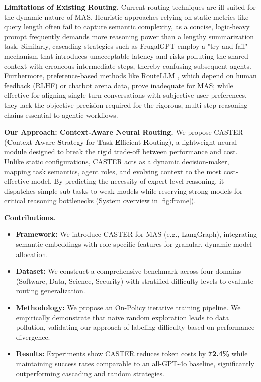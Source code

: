 \documentclass{article}
\theoremstyle{plain}
\theoremstyle{definition}
\theoremstyle{remark}
\begin{document}
\textbf{Limitations of Existing Routing.} Current routing techniques are ill-suited for the dynamic nature of MAS. Heuristic approaches relying on static metrics like query length often fail to capture semantic complexity, as a concise, logic-heavy prompt frequently demands more reasoning power than a lengthy summarization task. Similarly, cascading strategies such as FrugalGPT \cite{chen2023frugalgpt} employ a "try-and-fail" mechanism that introduces unacceptable latency and risks polluting the shared context with erroneous intermediate steps, thereby confusing subsequent agents. Furthermore, preference-based methods like RouteLLM \cite{ong2024routellm}, which depend on human feedback (RLHF) or chatbot arena data, prove inadequate for MAS; while effective for aligning single-turn conversations with subjective user preferences, they lack the objective precision required for the rigorous, multi-step reasoning chains essential to agentic workflows.


\textbf{Our Approach: Context-Aware Neural Routing.} We propose CASTER (\textbf{C}ontext-\textbf{A}ware \textbf{S}trategy for \textbf{T}ask \textbf{E}fficient \textbf{R}outing), a lightweight neural module designed to break the rigid trade-off between performance and cost. Unlike static configurations, CASTER acts as a dynamic decision-maker, mapping task semantics, agent roles, and evolving context to the most cost-effective model. By predicting the necessity of expert-level reasoning, it dispatches simple sub-tasks to weak models while reserving strong models for critical reasoning bottlenecks (System overview in \cref{fig:frame}).

\textbf{Contributions.} \begin{itemize} \item \textbf{Framework:} We introduce CASTER for MAS (e.g., LangGraph), integrating semantic embeddings with role-specific features for granular, dynamic model allocation. \item \textbf{Dataset:} We construct a comprehensive benchmark across four domains (Software, Data, Science, Security) with stratified difficulty levels to evaluate routing generalization. \item \textbf{Methodology:} We propose an On-Policy iterative training pipeline. We empirically demonstrate that naive random exploration leads to data pollution, validating our approach of labeling difficulty based on performance divergence. \item \textbf{Results:} Experiments show CASTER reduces token costs by \textbf{72.4\%} while maintaining success rates comparable to an all-GPT-4o baseline, significantly outperforming cascading and random strategies. \end{itemize}
\end{document}
